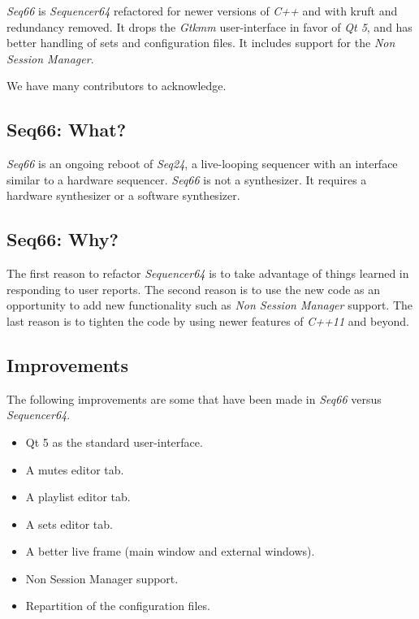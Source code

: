 \documentclass[
 11pt,
 twoside,
 a4paper,
 headinclude,
 footinclude,
 final                                 %
]{article}
\begin{document}
   \textsl{Seq66} is \textsl{Sequencer64} refactored for newer versions of
   \textsl{C++} and with kruft and redundancy removed.  It drops the
   \textsl{Gtkmm} user-interface in favor of \textsl{Qt 5},
   and has better handling of sets and configuration files.
   It includes support for the \textsl{Non Session Manager}.

   We have many contributors to acknowledge.

\subsection{Seq66: What?}
\label{subsec:what_is_sequencer66}

   \textsl{Seq66} is an ongoing reboot of \textsl{Seq24},
   a live-looping sequencer with an interface similar to a hardware sequencer.
   \textsl{Seq66} is not a synthesizer.  It requires a hardware
   synthesizer or a software synthesizer.


\subsection{Seq66: Why?}
\label{subsec:introduction_seq66_vs_others}

   The first reason to refactor \textsl{Sequencer64} is to take advantage of
   things learned in responding to user reports.  The second reason is to use
   the new code as an opportunity to add new functionality such as
   \textsl{Non Session Manager} support.  The last reason is to tighten the
   code by using newer features of \textsl{C++11} and beyond.

\subsection{Improvements}
\label{subsec:improvements}

   The following improvements are some that have been made in
   \textsl{Seq66} versus \textsl{Sequencer64}.

   \begin{itemize}
      \item Qt 5 as the standard user-interface.
      \item A mutes editor tab.
      \item A playlist editor tab.
      \item A sets editor tab.
      \item A better live frame (main window and external windows).
      \item Non Session Manager support.
      \item Repartition of the configuration files.
   \end{itemize}
\end{document}
